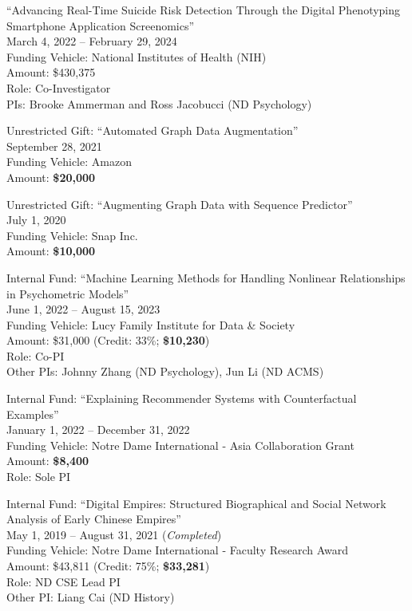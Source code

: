 \documentclass[10pt]{article}
\newenvironment{myindentpar}[1]%
{\begin{list}{}%
         {\setlength{\leftmargin}{#1}}%
         \item[]%
}
{\end{list}}
\newcounter{list}
\begin{document}
\begin{myindentpar}{0.75cm}
\hspace{-0.75cm}``Advancing Real-Time Suicide Risk Detection Through the Digital Phenotyping Smartphone Application Screenomics'' \\
March 4, 2022 -- February 29, 2024 \\
Funding Vehicle: National Institutes of Health  (NIH) \\
Amount: \$430,375 \\
Role: {Co-Investigator} \\
PIs: Brooke Ammerman and Ross Jacobucci (ND Psychology)

\hspace{-0.75cm}Unrestricted Gift: ``Automated Graph Data Augmentation''\\
September 28, 2021 \\
Funding Vehicle: Amazon \\
Amount: \textbf{\$20,000}

\hspace{-0.75cm}Unrestricted Gift: ``Augmenting Graph Data with Sequence Predictor'' \\
July 1, 2020 \\
Funding Vehicle: Snap Inc. \\
Amount: \textbf{\$10,000}

\hspace{-0.75cm}Internal Fund: ``Machine Learning Methods for Handling Nonlinear Relationships in Psychometric Models'' \\
June 1, 2022 -- August 15, 2023 \\
Funding Vehicle: Lucy Family Institute for Data \& Society \\
Amount: \$31,000 (Credit: 33\%; \textbf{\$10,230}) \\
Role: {Co-PI} \\
Other PIs: Johnny Zhang (ND Psychology), Jun Li (ND ACMS)

\hspace{-0.75cm}Internal Fund: ``Explaining Recommender Systems with Counterfactual Examples''\\
January 1, 2022 -- December 31, 2022 \\
Funding Vehicle: Notre Dame International - Asia Collaboration Grant \\
Amount: \textbf{\$8,400} \\
Role: {Sole PI}

\hspace{-0.75cm}Internal Fund: ``Digital Empires: Structured Biographical and Social Network Analysis of Early Chinese Empires'' \\
May 1, 2019 -- August 31, 2021 (\emph{Completed}) \\
Funding Vehicle: Notre Dame International - Faculty Research Award \\
Amount: \$43,811 (Credit: 75\%; \textbf{\$33,281}) \\
Role: {ND CSE Lead PI} \\
Other PI: Liang Cai (ND History)

\end{myindentpar}
\end{document}
